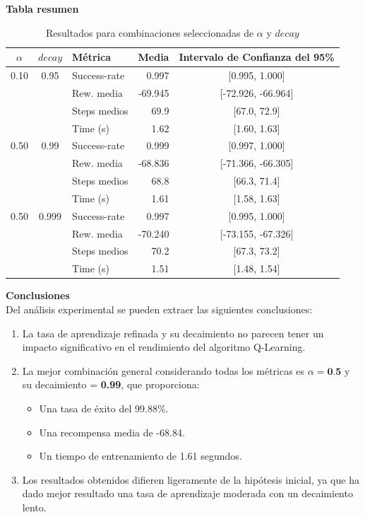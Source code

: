 \newpage
\textbf{Tabla resumen}

\begin{table}[H]
    \centering
    \begin{tabular}{|c|c|l|r|c|}
    \hline
    $\alpha$ & $decay$ & Métrica        & Media    & Intervalo de Confianza del 95\% \\
    \hline
    0.10 & 0.95 & Success-rate  & 0.997   & [0.995, 1.000] \\
         &      & Rew. media    & -69.945 & [-72.926, -66.964] \\
         &      & Steps medios  & 69.9    & [67.0, 72.9] \\
         &      & Time (s)      & 1.62    & [1.60, 1.63] \\
    \hline
    0.50 & 0.99 & Success-rate  & 0.999   & [0.997, 1.000] \\
         &      & Rew. media    & -68.836 & [-71.366, -66.305] \\
         &      & Steps medios  & 68.8    & [66.3, 71.4] \\
         &      & Time (s)      & 1.61    & [1.58, 1.63] \\
    \hline
    0.50 & 0.999 & Success-rate  & 0.997   & [0.995, 1.000] \\
         &       & Rew. media    & -70.240 & [-73.155, -67.326] \\
         &       & Steps medios  & 70.2    & [67.3, 73.2] \\
         &       & Time (s)      & 1.51    & [1.48, 1.54] \\
    \hline
    \end{tabular}
    \caption{Resultados para combinaciones seleccionadas de $\alpha$ y $decay$}
    \label{tab:resultados_seleccionados}
\end{table}

    
\textbf{Conclusiones}
\\

Del análisis experimental se pueden extraer las siguientes conclusiones:

\begin{enumerate}
    \item La tasa de aprendizaje refinada y su decaimiento no parecen tener un impacto significativo en el rendimiento del algoritmo Q-Learning.
    \item La mejor combinación general considerando todas los métricas es $\alpha = \textbf{0.5}$ y su decaimiento = \textbf{0.99}, que proporciona:
    \begin{itemize}
        \item Una tasa de éxito del 99.88\%.
        \item Una recompensa media de -68.84.
        \item Un tiempo de entrenamiento de 1.61 segundos.
    \end{itemize}
    \item Los resultados obtenidos difieren ligeramente de la hipótesis inicial, ya que ha dado mejor resultado una tasa de aprendizaje moderada con un decaimiento lento. 
\end{enumerate}

